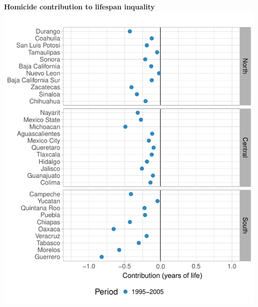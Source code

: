\documentclass[xcolor={dvipsnames}]{beamer}
\begin{document}
\begin{frame}
	\begin{center}
		\Large{\textbf{Homicide contribution to lifespan inquality}}
		\includegraphics[scale=.47]{Figures/Figure_4_1}
	\end{center}

\end{frame}
\end{document}
